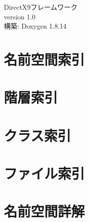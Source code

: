 \documentclass[twoside]{book}
\newcommand{\+}{\discretionary{\mbox{\scriptsize$\hookleftarrow$}}{}{}}
\newcommand{\clearemptydoublepage}{%
  \newpage{\pagestyle{empty}\cleardoublepage}%
}
\begin{document}
\hypersetup{pageanchor=false,
             bookmarksnumbered=true,
             pdfencoding=unicode
            }
\begin{titlepage}
\vspace*{7cm}
\begin{center}%
{\Large Direct\+X9フレームワーク \\[1ex]\large version 1.\+0 }\\
\vspace*{1cm}
{\large 構築\+: Doxygen 1.8.14}\\
\end{center}
\end{titlepage}
\clearemptydoublepage
{}
\tableofcontents
\clearemptydoublepage
{}
\hypersetup{pageanchor=true}

\chapter{名前空間索引}

\chapter{階層索引}

\chapter{クラス索引}

\chapter{ファイル索引}

\chapter{名前空間詳解}







\end{document}
